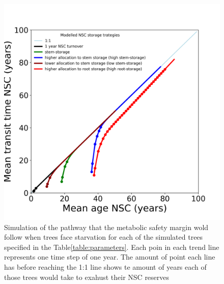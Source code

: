 \documentclass{article}
\begin{document}



 \begin{figure}[h] %
   \centering
   \includegraphics[width=5in]{Starvation_different_trees.png} 
   \caption{Simulation of the pathway that the metabolic safety margin wold follow when trees face starvation for each of the simulated trees specified in the Table\ref{table:parameters}. Each poin in each trend line represents one time step of one year. The amount of point each line has before reaching the 1:1 line shows te amount of years each of those trees would take to exahust their NSC reserves}
   \label{fig:starvation}
\end{figure}
\end{document}
